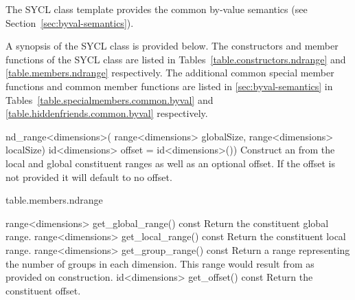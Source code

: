 The SYCL  class template provides the common by-value
semantics (see Section~\ref{sec:byval-semantics}).

A synopsis of the SYCL  class is provided below. The constructors and member functions of the SYCL  class are listed in Tables~\ref{table.constructors.ndrange} and \ref{table.members.ndrange} respectively. The additional common special member functions and common member functions are listed in \ref{sec:byval-semantics} in Tables~\ref{table.specialmembers.common.byval} and \ref{table.hiddenfriends.common.byval} respectively.

  \addRowFourL
    {nd_range<dimensions>(}
    {  range<dimensions> globalSize,}
    {  range<dimensions> localSize)}
    {  id<dimensions> offset = id<dimensions>())}
    {
        Construct an  from the local and global
        constituent ranges as well as an optional offset. If the
        offset is not provided it will default to no offset.
    }
  \completeTable

  {table.members.ndrange}

  \addRow
    {range<dimensions> get_global_range() const}
    {
        Return the constituent global range.
    }
  \addRow
    {range<dimensions> get_local_range() const}
    {
        Return the constituent local range.
    }
  \addRow
    {range<dimensions> get_group_range() const}
    {
        Return a range representing the number of groups in each
        dimension.  This range would result from
         as provided on construction.
    }
  \addRow
    {id<dimensions> get_offset() const}
    {
        Return the constituent offset.
    }
 \completeTable

